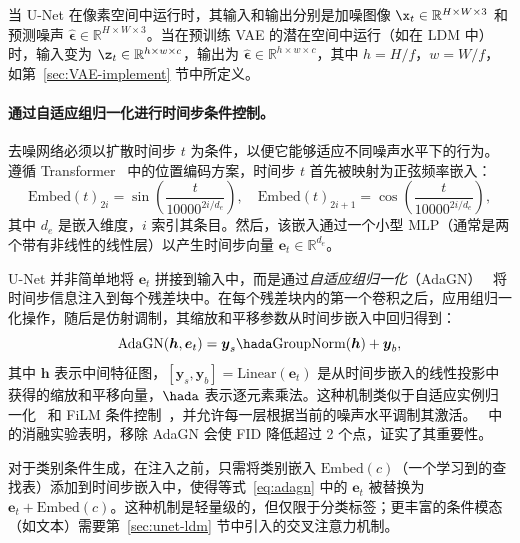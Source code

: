 \documentclass[../../book-main_zh.tex]{subfiles}
\begin{document}
当 U-Net 在像素空间中运行时，其输入和输出分别是加噪图像 $\x_t \in \mathbb{R}^{H \times W \times 3}$ 和预测噪声 $\hat{\boldsymbol{\epsilon}} \in \mathbb{R}^{H \times W \times 3}$。当在预训练 VAE 的潜在空间中运行（如在 LDM 中）时，输入变为 $\z_t \in \mathbb{R}^{h \times w \times c}$，输出为 $\hat{\boldsymbol{\epsilon}} \in \mathbb{R}^{h \times w \times c}$，其中 $h = H/f$，$w = W/f$，如第~\ref{sec:VAE-implement} 节中所定义。

\paragraph{通过自适应组归一化进行时间步条件控制。}
去噪网络必须以扩散时间步 $t$ 为条件，以便它能够适应不同噪声水平下的行为。遵循 Transformer~\citep{vaswani2017attention} 中的位置编码方案，时间步 $t$ 首先被映射为正弦频率嵌入：
\begin{equation}
    \mathrm{Embed}(t)_{2i} = \sin\!\left(\frac{t}{10000^{2i/d_e}}\right), \quad
    \mathrm{Embed}(t)_{2i+1} = \cos\!\left(\frac{t}{10000^{2i/d_e}}\right),
\end{equation}
其中 $d_e$ 是嵌入维度，$i$ 索引其条目。然后，该嵌入通过一个小型 MLP（通常是两个带有非线性的线性层）以产生时间步向量 $\boldsymbol{e}_t \in \mathbb{R}^{d_e}$。

U-Net 并非简单地将 $\boldsymbol{e}_t$ 拼接到输入中，而是通过\emph{自适应组归一化}（AdaGN）~\citep{dhariwal2021diffusion} 将时间步信息注入到每个残差块中。在每个残差块内的第一个卷积之后，应用组归一化操作，随后是仿射调制，其缩放和平移参数从时间步嵌入中回归得到：
\begin{equation}
    \mathrm{AdaGN}(\boldsymbol{h}, \boldsymbol{e}_t) = \boldsymbol{y}_s \hada \mathrm{GroupNorm}(\boldsymbol{h}) + \boldsymbol{y}_b,
    \label{eq:adagn}
\end{equation}
其中 $\boldsymbol{h}$ 表示中间特征图，$[\boldsymbol{y}_s, \boldsymbol{y}_b] = \mathrm{Linear}(\boldsymbol{e}_t)$ 是从时间步嵌入的线性投影中获得的缩放和平移向量，$\hada$ 表示逐元素乘法。这种机制类似于自适应实例归一化~\citep{dumoulin2017learned} 和 FiLM 条件控制~\citep{perez2018film}，并允许每一层根据当前的噪声水平调制其激活。~\citep{dhariwal2021diffusion} 中的消融实验表明，移除 AdaGN 会使 FID 降低超过 2 个点，证实了其重要性。

对于类别条件生成，在注入之前，只需将类别嵌入 $\mathrm{Embed}(c)$（一个学习到的查找表）添加到时间步嵌入中，使得等式~\eqref{eq:adagn} 中的 $\boldsymbol{e}_t$ 被替换为 $\boldsymbol{e}_t + \mathrm{Embed}(c)$。这种机制是轻量级的，但仅限于分类标签；更丰富的条件模态（如文本）需要第~\ref{sec:unet-ldm} 节中引入的交叉注意力机制。
\end{document}
